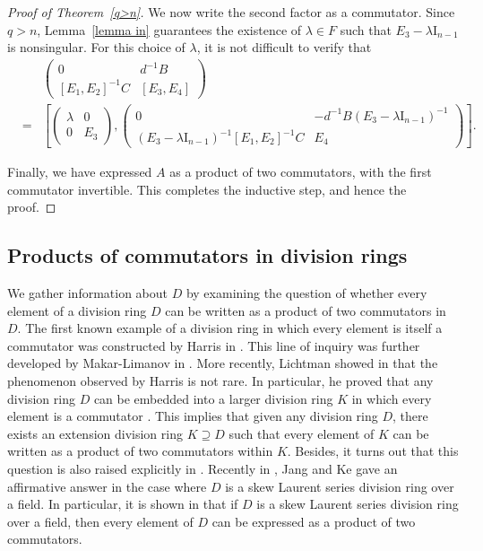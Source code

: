 \documentclass[11pt]{article}
\theoremstyle{definition}
\begin{document}
{{{{\begin{proof}[Proof of Theorem~\ref{q>n}]
					We now write the second factor as a commutator.
					Since $q > n$, Lemma~\ref{lemma in} guarantees the existence of $\lambda \in F$ such that $E_3 - \lambda \mathrm{I}_{n-1}$ is nonsingular. For this choice of $\lambda$, it is not difficult to verify that
					\begin{eqnarray*}
						&&	\begin{pmatrix}
							0 & d^{-1}B \\
							[E_1, E_2]^{-1}C & [E_3, E_4]
						\end{pmatrix}\\
						&=&
						\left[
						\begin{pmatrix}
							\lambda & 0 \\
							0 & E_3
						\end{pmatrix},
						\begin{pmatrix}
							0 & -d^{-1}B(E_3 - \lambda \mathrm{I}_{n-1})^{-1} \\
							(E_3 - \lambda \mathrm{I}_{n-1})^{-1}[E_1, E_2]^{-1}C & E_4
						\end{pmatrix}
						\right].
					\end{eqnarray*}
					
					Finally, we have expressed $A$ as a product of two commutators, with the first commutator invertible. This completes the inductive step, and hence the proof.
				\end{proof}
				
				\subsection{Products of commutators in division rings}
				
				We gather information about $D$ by examining the question of whether every element of a division ring \( D \) can be written as a product of two commutators in \( D \). The first known example of a division ring in which every element is itself a commutator was constructed by Harris in \cite{Pa_Ha_58}. This line of inquiry was further developed by Makar-Limanov in \cite{Pa_Ma_89}. More recently, Lichtman showed in \cite{Pa_Li_05} that the phenomenon observed by Harris is not rare. In particular, he proved that any division ring \( D \) can be embedded into a larger division ring \( K \) in which every element is a commutator \cite[Corollary]{Pa_Li_05}. This implies that given any division ring \( D \), there exists an extension division ring \( K \supseteq D \) such that every element of \( K \) can be written as a product of two commutators within \( K \).  Besides, it turns out that this question is also raised explicitly in \cite[Question~5.9]{Pa_Ga_25}. Recently in \cite{Pa_JaKe_25}, Jang and Ke gave an affirmative answer in the case where \( D \) is a skew Laurent series division ring over a field. In particular, it is shown in \cite[Theorem]{Pa_JaKe_25} that if $D$ is a skew Laurent series division ring over a field, then every element of $D$ can be expressed as a product of two commutators.			
				
}}}}
\end{document}
